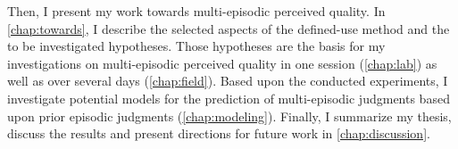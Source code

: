 Then, I present my work towards multi-episodic perceived quality. %
In \autoref{chap:towards}, I describe the selected aspects of the defined-use method and the to be investigated hypotheses.
Those hypotheses are the basis for my investigations on multi-episodic perceived quality in one session (\autoref{chap:lab}) as well as over several days (\autoref{chap:field}).
Based upon the conducted experiments, I investigate potential models for the prediction of multi-episodic judgments based upon prior episodic judgments (\autoref{chap:modeling}).
Finally, I summarize my thesis, discuss the results and present directions for future work in \autoref{chap:discussion}.
